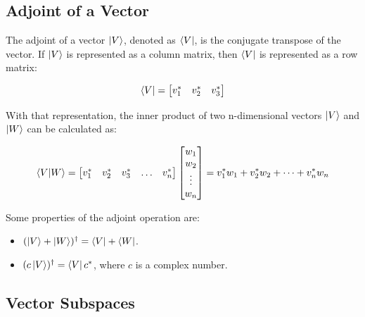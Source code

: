 \documentclass[12pt,a4paper]{report}
\begin{document}
\subsection{Adjoint of a Vector}

The adjoint of a vector $\ket{V}$, denoted as $\bra{V}$, is the conjugate transpose of the vector. If $\ket{V}$ is represented as a column matrix, then $\bra{V}$ is represented as a row matrix:

\begin{equation*}
    \bra{V} = \begin{bmatrix}
        v_1^* & v_2^* & v_3^*
    \end{bmatrix}
\end{equation*}

With that representation, the inner product of two n-dimensional vectors $\ket{V}$ and $\ket{W}$ can be calculated as:

\begin{equation*}
    \bra{V}\ket{W} = \begin{bmatrix}
        v_1^* & v_2^* & v_3^* & \ldots & v_n^*
    \end{bmatrix}
    \begin{bmatrix}
        w_1 \\
        w_2 \\
        \vdots \\
        w_n
    \end{bmatrix}
    = v_1^*w_1 + v_2^*w_2 + \cdots + v_n^*w_n
\end{equation*}

Some properties of the adjoint operation are:
\begin{itemize}
    \item $(\ket{V} + \ket{W})^\dagger = \bra{V} + \bra{W}$.
    \item $(c\ket{V})^\dagger = \bra{V} c^*$, where $c$ is a complex number.
\end{itemize}

\subsection{Vector Subspaces}
\end{document}
